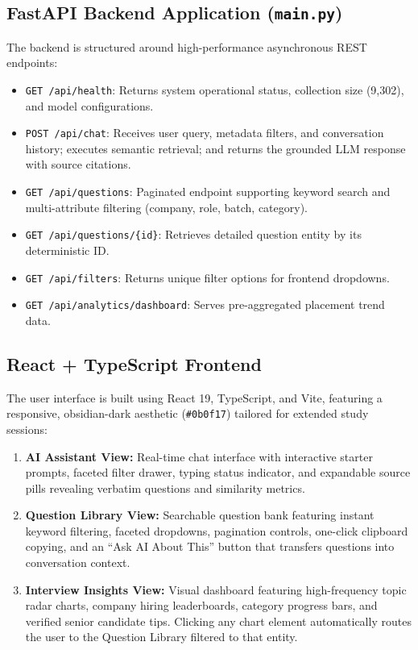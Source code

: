 \documentclass[11pt]{article}
\begin{document}
\subsection{FastAPI Backend Application (\texttt{main.py})}
The backend is structured around high-performance asynchronous REST endpoints:
\begin{itemize}[leftmargin=1.5em]
    \item \texttt{GET /api/health}: Returns system operational status, collection size (9,302), and model configurations.
    \item \texttt{POST /api/chat}: Receives user query, metadata filters, and conversation history; executes semantic retrieval; and returns the grounded LLM response with source citations.
    \item \texttt{GET /api/questions}: Paginated endpoint supporting keyword search and multi-attribute filtering (company, role, batch, category).
    \item \texttt{GET /api/questions/\{id\}}: Retrieves detailed question entity by its deterministic ID.
    \item \texttt{GET /api/filters}: Returns unique filter options for frontend dropdowns.
    \item \texttt{GET /api/analytics/dashboard}: Serves pre-aggregated placement trend data.
\end{itemize}

\subsection{React + TypeScript Frontend}
The user interface is built using React 19, TypeScript, and Vite, featuring a responsive, obsidian-dark aesthetic (\texttt{\#0b0f17}) tailored for extended study sessions:
\begin{enumerate}[leftmargin=1.5em]
    \item \textbf{AI Assistant View:} Real-time chat interface with interactive starter prompts, faceted filter drawer, typing status indicator, and expandable source pills revealing verbatim questions and similarity metrics.
    \item \textbf{Question Library View:} Searchable question bank featuring instant keyword filtering, faceted dropdowns, pagination controls, one-click clipboard copying, and an ``Ask AI About This'' button that transfers questions into conversation context.
    \item \textbf{Interview Insights View:} Visual dashboard featuring high-frequency topic radar charts, company hiring leaderboards, category progress bars, and verified senior candidate tips. Clicking any chart element automatically routes the user to the Question Library filtered to that entity.
\end{enumerate}
\end{document}
